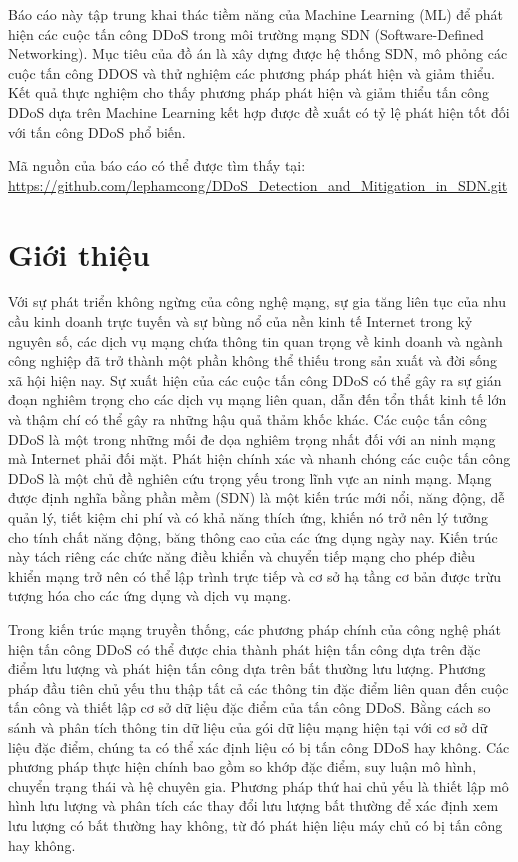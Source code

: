 \documentclass[a4paper]{article}
\begin{document}
Báo cáo này tập trung khai thác tiềm năng của Machine Learning (ML) để phát hiện các cuộc tấn công DDoS trong môi trường mạng SDN (Software-Defined Networking).  Mục tiêu của đồ án là xây dựng được hệ thống SDN, mô phỏng các cuộc tấn công DDOS và thử nghiệm các phương pháp phát hiện và giảm thiểu. Kết quả thực nghiệm cho thấy phương pháp phát hiện và giảm thiểu tấn công DDoS dựa trên Machine Learning kết hợp được đề xuất có tỷ lệ phát hiện tốt đối với tấn công DDoS phổ biến.

Mã nguồn của báo cáo có thể được tìm thấy tại: \url{https://github.com/lephamcong/DDoS_Detection_and_Mitigation_in_SDN.git}

\section{Giới thiệu}
Với sự phát triển không ngừng của công nghệ mạng, sự gia tăng liên tục của nhu cầu kinh doanh trực tuyến và sự bùng nổ của nền kinh tế Internet trong kỷ nguyên số, các dịch vụ mạng chứa thông tin quan trọng về kinh doanh và ngành công nghiệp đã trở thành một phần không thể thiếu trong sản xuất và đời sống xã hội hiện nay. Sự xuất hiện của các cuộc tấn công DDoS có thể gây ra sự gián đoạn nghiêm trọng cho các dịch vụ mạng liên quan, dẫn đến tổn thất kinh tế lớn và thậm chí có thể gây ra những hậu quả thảm khốc khác. Các cuộc tấn công DDoS là một trong những mối đe dọa nghiêm trọng nhất đối với an ninh mạng mà Internet phải đối mặt. Phát hiện chính xác và nhanh chóng các cuộc tấn công DDoS là một chủ đề nghiên cứu trọng yếu trong lĩnh vực an ninh mạng. Mạng được định nghĩa bằng phần mềm (SDN) là một kiến trúc mới nổi, năng động, dễ quản lý, tiết kiệm chi phí và có khả năng thích ứng, khiến nó trở nên lý tưởng cho tính chất năng động, băng thông cao của các ứng dụng ngày nay. Kiến trúc này tách riêng các chức năng điều khiển và chuyển tiếp mạng cho phép điều khiển mạng trở nên có thể lập trình trực tiếp và cơ sở hạ tầng cơ bản được trừu tượng hóa cho các ứng dụng và dịch vụ mạng. 

Trong kiến trúc mạng truyền thống, các phương pháp chính của công nghệ phát hiện tấn công DDoS có thể được chia thành phát hiện tấn công dựa trên đặc điểm lưu lượng và phát hiện tấn công dựa trên bất thường lưu lượng. Phương pháp đầu tiên chủ yếu thu thập tất cả các thông tin đặc điểm liên quan đến cuộc tấn công và thiết lập cơ sở dữ liệu đặc điểm của tấn công DDoS. Bằng cách so sánh và phân tích thông tin dữ liệu của gói dữ liệu mạng hiện tại với cơ sở dữ liệu đặc điểm, chúng ta có thể xác định liệu có bị tấn công DDoS hay không. Các phương pháp thực hiện chính bao gồm so khớp đặc điểm, suy luận mô hình, chuyển trạng thái và hệ chuyên gia. Phương pháp thứ hai chủ yếu là thiết lập mô hình lưu lượng và phân tích các thay đổi lưu lượng bất thường để xác định xem lưu lượng có bất thường hay không, từ đó phát hiện liệu máy chủ có bị tấn công hay không.
\end{document}
